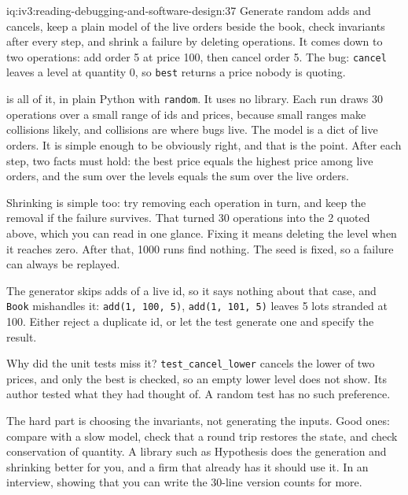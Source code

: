 \begin{solution}{iq:iv3:reading-debugging-and-software-design:37}
Generate random adds and cancels, keep a plain model of the live orders beside the book, check invariants after every step, and shrink a failure by deleting operations. It comes down to two operations: add order 5 at price 100, then cancel order 5. The bug: \texttt{cancel} leaves a level at quantity 0, so \texttt{best} returns a price nobody is quoting.

 is all of it, in plain Python with \texttt{random}. It uses no library. Each run draws 30 operations over a small range of ids and prices, because small ranges make collisions likely, and collisions are where bugs live. The model is a dict of live orders. It is simple enough to be obviously right, and that is the point. After each step, two facts must hold: the best price equals the highest price among live orders, and the sum over the levels equals the sum over the live orders.

\label{lst:iv3:rd:propcheck}

Shrinking is simple too: try removing each operation in turn, and keep the removal if the failure survives. That turned 30 operations into the 2 quoted above, which you can read in one glance. Fixing it means deleting the level when it reaches zero. After that, 1000 runs find nothing. The seed is fixed, so a failure can always be replayed.

The generator skips adds of a live id, so it says nothing about that case, and \texttt{Book} mishandles it: \texttt{add(1, 100, 5)}, \texttt{add(1, 101, 5)} leaves 5 lots stranded at 100. Either reject a duplicate id, or let the test generate one and specify the result.

Why did the unit tests miss it? \texttt{test\_cancel\_lower} cancels the lower of two prices, and only the best is checked, so an empty lower level does not show. Its author tested what they had thought of. A random test has no such preference.

The hard part is choosing the invariants, not generating the inputs. Good ones: compare with a slow model, check that a round trip restores the state, and check conservation of quantity. A library such as Hypothesis does the generation and shrinking better for you, and a firm that already has it should use it. In an interview, showing that you can write the 30-line version counts for more.


\end{solution}

